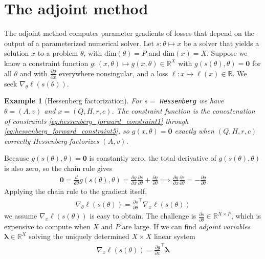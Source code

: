 \documentclass[a4paper,12pt]{article}
\newtheorem{example}{Example}
\theoremstyle{definition}
\begin{document}
\section{The adjoint method}\label{app:adjoint_method}
The adjoint method computes parameter gradients of losses that depend on the output of a parameterized numerical solver. Let $s : \theta \mapsto x$ be a solver that yields a solution $x$ to a problem $\theta$, with $\text{dim}(\theta) = P$ and $\text{dim}(x) = X$. Suppose we know a constraint function $g : (x, \theta) \mapsto g(x, \theta) \in \mathbb{R}^X$ with $g(s(\theta), \theta) = \mathbf{0}$ for all $\theta$ and with $\frac{\partial g}{\partial x}$ everywhere nonsingular, and a loss $\ell : x \mapsto \ell(x) \in \mathbb{R}$. We seek $\nabla_\theta \ell(s(\theta))$.
\begin{example}[Hessenberg factorization]
    For $s = $ \texttt{Hessenberg} we have $\theta = (A, v)$ and $x = (Q, H, r, c)$. The constraint function is the concatenation of constraints \eqref{eq:hessenberg_forward_constraint1} through \eqref{eq:hessenberg_forward_constraint5}, so $g(x, \theta) = \mathbf{0}$ exactly when $(Q, H, r, c)$ correctly Hessenberg-factorizes $(A, v)$.
\end{example}
Because $g(s(\theta), \theta) = \mathbf{0}$ is constantly zero, the total derivative of $g(s(\theta), \theta)$ is also zero, so the chain rule gives
\begin{align}
    \mathbf{0} = \frac{d}{d\theta} g(s(\theta), \theta) = \frac{\partial g}{\partial x} \frac{\partial s}{\partial \theta} + \frac{\partial g}{\partial \theta}
    \implies \frac{\partial g}{\partial x} \frac{\partial s}{\partial \theta} = -\frac{\partial g}{\partial \theta} \label{eq:exploit_constraint}
\end{align}
Applying the chain rule to the gradient itself,
\begin{align}
    \nabla_\theta \ell(s(\theta)) = \frac{\partial s}{\partial \theta}^\top\nabla_x \ell(s(\theta))  \label{eq:gradient_chain_rule}
\end{align}
we assume $\nabla_x \ell(s(\theta))$ is easy to obtain. The challenge is $\frac{\partial s}{\partial \theta} \in \mathbb{R}^{X \times P}$, which is expensive to compute when $X$ and $P$ are large. If we can find \textit{adjoint variables} $\boldsymbol{\lambda} \in \mathbb{R}^X$ solving the uniquely determined $X \times X$ linear system
\begin{align}
    \nabla_x \ell(s(\theta)) = \frac{\partial g}{\partial x}^\top \boldsymbol{\lambda}  \label{eq:adjoint_system}
\end{align}
\end{document}
